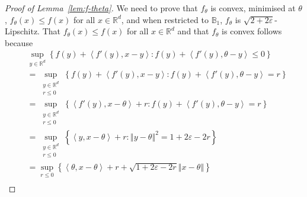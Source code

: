 \documentclass[letter, 12pt]{report}
\newcommand{\R}{\mathbb R}
\newcommand{\ip}[1]{\left \langle #1 \right \rangle}
\newcommand{\ball}{\mathbb{B}}
\newcommand{\norm}[1]{\left \Vert  #1 \right \Vert}
\newcommand{\1}{\mathbf{1}}
\renewcommand{\epsilon}{\varepsilon}
\theoremstyle{plain}
\theoremstyle{definition}
\theoremstyle{remark}
\begin{document}
\begin{proof}[Proof of Lemma~\ref{lem:f-theta}] \label{app:proof:f-theta}
    We need to prove that $f_\theta$ is convex, minimised at $\theta$,
    $f_\theta(x) \leq f(x)$ for all $x \in \R^d$, and
    when restricted to $\ball_1$, $f_\theta$ is $\sqrt{2 + 2\epsilon}$-Lipschitz.
    That $f_\theta(x) \leq f(x)$ for all $x \in \R^d$ and that $f_\theta$ is convex follows because
    \begin{align}
         & \sup_{y \in \R^d} \left\{ f(y) + \ip{f'(y), x - y} : f(y) + \ip{f'(y), \theta - y} \leq 0\right\}  \nonumber                           \\
         & = \sup_{\substack{y \in \R^d                                                                                                           \\ r \leq 0}} \left\{ f(y) + \ip{f'(y), x - y} : f(y) + \ip{f'(y), \theta - y} = r \right\} \nonumber\\
         & = \sup_{\substack{y \in \R^d                                                                                                           \\ r \leq 0}} \left\{ \ip{f'(y), x - \theta} + r : f(y) + \ip{f'(y), \theta - y} = r \right\} \nonumber\\
         & = \sup_{\substack{y \in \R^d                                                                                                           \\ r \leq 0}} \left\{  \ip{y, x - \theta} + r : \norm{y - \theta}^2 = 1 + 2\epsilon - 2r \right\} \nonumber\\
         & = \sup_{r \leq 0} \left\{  \ip{\theta, x - \theta} + r + \sqrt{1 + 2\epsilon - 2r} \norm{x - \theta} \right\} \nonumber                \\

\end{align}
\end{proof}
\end{document}
